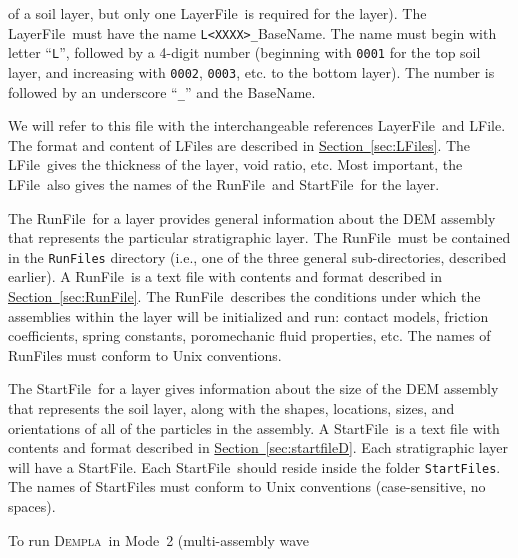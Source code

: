 \documentclass[letterpaper,11pt]{article}
\newcommand{\Dempla}{\textsc{Dempla}}
\newcommand{\RunFile}{\textsf{RunFile}}
\newcommand{\StartFile}{\textsf{StartFile}}
\newcommand{\BaseName}{\textsf{BaseName}}
\newcommand{\LayerFile}{\textsf{LayerFile}}
\newcommand{\LFile}{\textsf{LFile}}
\begin{document}
\begin{enumerate}
        of a soil layer, but only one \LayerFile\ is required
        for the layer).
        The \LayerFile\ must have the name
        \texttt{L<XXXX>\_}\BaseName.
        The name must begin with letter ``\texttt{L}'',
        followed by a 4-digit number
        (beginning with \texttt{0001} for the top soil layer,
        and increasing with \texttt{0002}, \texttt{0003}, etc.
        to the bottom layer).
        The number is followed by an underscore ``\texttt{\_}''
        and the \BaseName.
        \par
        We will refer to this file with the interchangeable
        references \LayerFile\ and \LFile.
        The format and content of \LFile s are described
        in \hyperref[sec:LFiles]{Section~\ref*{sec:LFiles}}.
        The \LFile\ gives the thickness of the layer,
        void ratio, etc.
        Most important, the \LFile\ also gives the names of the
        \RunFile\ and \StartFile\ for the layer.
        \par
        The \RunFile\ for a layer
        provides general information about the
        DEM assembly that represents the particular stratigraphic
        layer.
        The \RunFile\ must be contained in the \texttt{RunFiles}
        directory (i.e., one of the three general sub-directories,
        described earlier).
        A \RunFile\ is a text file with
        contents and format described in
        \hyperref[sec:RunFile]{Section~\ref*{sec:RunFile}}.
        The \RunFile\ describes
        the conditions under which the
        assemblies within the layer will be initialized
        and run:
        contact models,
        friction coefficients, spring constants,
        poromechanic fluid properties, etc.
        The names of \RunFile s must conform
        to Unix conventions.
        \par
        The \StartFile\ for a layer gives information
        about the size of the DEM assembly that represents
        the soil layer, along with the shapes, locations, sizes,
        and orientations of all of the particles in the assembly.
        A \StartFile\ is a text file with
        contents and format described in
        \hyperref[sec:startfileD]{Section~\ref*{sec:startfileD}}.
        Each stratigraphic layer will have a \StartFile.
        Each \StartFile\ should reside inside the
        folder \texttt{StartFiles}.
        The names of \StartFile s must conform
        to Unix conventions
        (case-sensitive, no spaces).
    \end{enumerate}
%
    To run \Dempla\ in Mode~2 (multi-assembly wave
\end{document}
